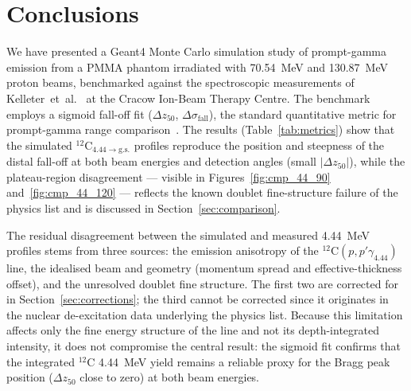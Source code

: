 \documentclass[a4paper]{article}
\begin{document}
\section{Conclusions}
\label{sec:conclusions}

We have presented a Geant4 Monte Carlo simulation study of prompt-gamma emission from a PMMA phantom irradiated with 70.54~MeV and 130.87~MeV proton beams, benchmarked against the spectroscopic measurements of Kelleter~et~al.~\cite{kelleter2017} at the Cracow Ion-Beam Therapy Centre. The benchmark employs a sigmoid fall-off fit ($\Delta z_{50}$, $\Delta\sigma_\mathrm{fall}$), the standard quantitative metric for prompt-gamma range comparison~\cite{janssen2014,pinto2015,valencialozano2023}. The results (Table~\ref{tab:metrics}) show that the simulated $^{12}$C$_{4.44\to\mathrm{g.s.}}$ profiles reproduce the position and steepness of the distal fall-off at both beam energies and detection angles (small $|\Delta z_{50}|$), while the plateau-region disagreement — visible in Figures~\ref{fig:cmp_44_90} and~\ref{fig:cmp_44_120} — reflects the known doublet fine-structure failure of the physics list and is discussed in Section~\ref{sec:comparison}.

The residual disagreement between the simulated and measured 4.44~MeV profiles stems from three sources: the emission anisotropy of the $^{12}$C$(p,p'\gamma_{4.44})$ line, the idealised beam and geometry (momentum spread and effective-thickness offset), and the unresolved doublet fine structure. The first two are corrected for in Section~\ref{sec:corrections}; the third cannot be corrected since it originates in the nuclear de-excitation data underlying the physics list. Because this limitation affects only the fine energy structure of the line and not its depth-integrated intensity, it does not compromise the central result: the sigmoid fit confirms that the integrated $^{12}$C 4.44~MeV yield remains a reliable proxy for the Bragg peak position ($\Delta z_{50}$ close to zero) at both beam energies.
\end{document}
